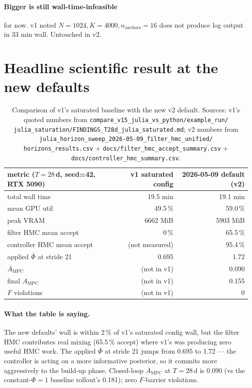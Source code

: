 \documentclass[11pt,a4paper]{article}
\begin{document}
\paragraph{Bigger is still wall-time-infeasible} for now. v1 noted
$N = 1024, K = 4000, n_{\mathrm{anchors}} = 16$ does not produce
log output in 33 min wall. Untouched in v2.


\section{Headline scientific result at the new defaults}
\label{sec:headline}

\begin{table}[ht]
\centering
\small
\begin{tabular}{lrr}
\toprule
metric ($T = 28$\,d, seed=42, RTX 5090) & v1 saturated config & 2026-05-09 default (v2) \\
\midrule
total wall time              & 19.5 min  & 19.1 min   \\
mean GPU util                & 49.5\,\%  & 59.0\,\%   \\
peak VRAM                    & 6662 MiB  & 5903 MiB   \\
filter HMC mean accept       & 0\,\%     & 65.5\,\%   \\
controller HMC mean accept   & (not measured) & 95.4\,\% \\
applied $\bar\Phi$ at stride 21 & 0.695  & 1.72       \\
$\overline{A}_{\mathrm{MPC}}$  & (not in v1) & 0.090   \\
final $A_{\mathrm{MPC}}$       & (not in v1) & 0.155   \\
$F$ violations                 & (not in v1) & 0       \\
\bottomrule
\end{tabular}
\caption{Comparison of v1's saturated baseline with the new v2
default. Sources: v1's quoted numbers from
\texttt{compare\_v15\_julia\_vs\_python/example\_run/}\\
\texttt{julia\_saturation/FINDINGS\_T28d\_julia\_saturated.md};
v2 numbers from
\texttt{julia\_horizon\_sweep\_2026-05-09\_filter\_hmc\_unified/}\\
\texttt{horizons\_results.csv} +
\texttt{docs/filter\_hmc\_accept\_summary.csv} +
\texttt{docs/controller\_hmc\_summary.csv}.}
\label{tab:headline}
\end{table}

\paragraph{What the table is saying.} The new defaults' wall is
within 2\,\% of v1's saturated config wall, but the filter HMC
contributes real mixing (65.5\,\% accept) where v1's was producing
zero useful HMC work. The applied $\bar\Phi$ at stride 21 jumps
from 0.695 to 1.72 --- the controller is acting on a more
informative posterior, so it commits more aggressively to the
build-up phase. Closed-loop $\overline{A}_{\mathrm{MPC}}$ at
$T = 28$\,d is 0.090 (vs the constant-$\Phi=1$ baseline rollout's
0.181); zero $F$-barrier violations.
\end{document}
